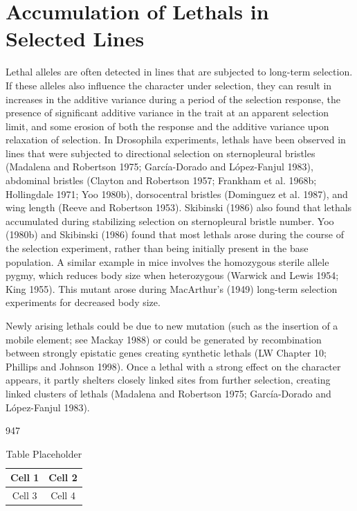 \documentclass{article}
\begin{document}
\section{Accumulation of Lethals in Selected Lines}
Lethal alleles are often detected in lines that are subjected to long-term selection. If these alleles also influence the character under selection, they can result in increases in the additive variance during a period of the selection response, the presence of significant additive variance in the trait at an apparent selection limit, and some erosion of both the response and the additive variance upon relaxation of selection. In Drosophila experiments, lethals have been observed in lines that were subjected to directional selection on sternopleural bristles (Madalena and Robertson 1975; García-Dorado and López-Fanjul 1983), abdominal bristles (Clayton and Robertson 1957; Frankham et al. 1968b; Hollingdale 1971; Yoo 1980b), dorsocentral bristles (Dominguez et al. 1987), and wing length (Reeve and Robertson 1953). Skibinski (1986) also found that lethals accumulated during stabilizing selection on sternopleural bristle number. Yoo (1980b) and Skibinski (1986) found that most lethals arose during the course of the selection experiment, rather than being initially present in the base population. A similar example in mice involves the homozygous sterile allele pygmy, which reduces body size when heterozygous (Warwick and Lewis 1954; King 1955). This mutant arose during MacArthur's (1949) long-term selection experiments for decreased body size.

Newly arising lethals could be due to new mutation (such as the insertion of a mobile element; see Mackay 1988) or could be generated by recombination between strongly epistatic genes creating synthetic lethals (LW Chapter 10; Phillips and Johnson 1998). Once a lethal with a strong effect on the character appears, it partly shelters closely linked sites from further selection, creating linked clusters of lethals (Madalena and Robertson 1975; García-Dorado and López-Fanjul 1983).

947

\begin{table}[h]
\centering
\begin{tabular}{|c|c|}
\hline
Cell 1 & Cell 2 \\
\hline
Cell 3 & Cell 4 \\
\hline
\end{tabular}
\caption{Table Placeholder}
\end{table}
\end{document}
